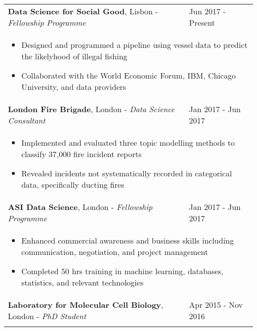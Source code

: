 \documentclass[a4paper, 11pt]{article}
\newcommand\markup[1]{{\textcolor{customgrey}{#1}}}
\begin{document}
    \begin{tabularx}{\textwidth}{X l}
        \textbf{Data Science for Social Good}, Lisbon - \emph{Fellowship Programme} & Jun 2017 - Present \\
        \multicolumn{2}{p{\textwidth}}{\vspace{-1.5em}
        \begin{itemize}
        \setlength\itemsep{-0.1em}
            \item \markup{Designed and programmed a pipeline using vessel data to predict the likelyhood of illegal fishing}
            \item \markup{Collaborated with the World Economic Forum, IBM, Chicago University, and data providers}
        \end{itemize}
        } \\
        \textbf{London Fire Brigade}, London - \emph{Data Science Consultant} & Jan 2017 - Jun 2017 \\
        \multicolumn{2}{p{\textwidth}}{\vspace{-1.5em}
        \begin{itemize}
        \setlength\itemsep{-0.1em}
        	\item \markup{Implemented and evaluated three topic modelling methods to classify 37,000 fire incident reports}
        	\item \markup{Revealed incidents not systematically recorded in categorical data, specifically ducting fires}
        \end{itemize}
        } \\
        \textbf{ASI Data Science}, London - \emph{Fellowship Programme} & Jan 2017 - Jun 2017 \\
        \multicolumn{2}{p{\textwidth}}{\vspace{-1.5em}
        \begin{itemize}\setlength\itemsep{-0.1em}
        	\item \markup{Enhanced commercial awareness and  business skills including communication, negotiation, and project management}
        	\item \markup{Completed 50 hrs training in machine learning, databases, statistics, and relevant technologies}
        \end{itemize}
        } \\
        \textbf{Laboratory for Molecular Cell Biology}, London - \emph{PhD Student} & Apr 2015 - Nov 2016 \\
        \multicolumn{2}{p{\textwidth}}{\vspace{-1.5em}
}
\end{tabularx}
\end{document}
